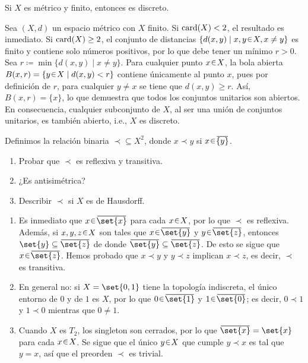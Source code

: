 \begin{ejer}
Si $X$ es métrico y finito, entonces es discreto.
\end{ejer}
\begin{sol}
Sea $(X,d)$ un espacio métrico con $X$ finito. Si $\operatorname{card}(X) < 2$, el resultado es inmediato. Si $\operatorname{card}(X) \ge 2$, el conjunto de distancias $\{ d(x,y) \mid x,y \en X, x \neq y \}$ es finito y contiene solo números positivos, por lo que debe tener un mínimo $r > 0$.
Sea $r \coloneq \min\{ d(x,y) \mid x \neq y \}$. Para cualquier punto $x \en X$, la bola abierta $B(x,r) = \{y \en X \mid d(x,y) < r\}$ contiene únicamente al punto $x$, pues por definición de $r$, para cualquier $y \neq x$ se tiene que $d(x,y) \ge r$.
Así, $B(x,r) = \{x\}$, lo que demuestra que todos los conjuntos unitarios son abiertos. En consecuencia, cualquier subconjunto de $X$, al ser una unión de conjuntos unitarios, es también abierto, i.e., $X$ es discreto.
\end{sol}

\begin{ejer}
Definimos la relación binaria ${\prec}\subseteq X^{2}$, donde $x\prec y$ si $x\en\ubar{\{y\}}$.
\begin{enumerate}[label = (\alph*)]
    \item Probar que $\prec$ es reflexiva y transitiva.
    \item ¿Es antisimétrica?
    \item Describir $\prec$ si $X$ es de Hausdorff.
\end{enumerate}
\end{ejer}
\begin{sol}[Demostración]
\hphantom{e}
\begin{enumerate}[label = (\alph*)]
    \item Es inmediato que $x \en \ubar{\set{x}}$ para cada $x \en X$, por lo que $\prec$ es reflexiva. Además, si $x, y, z \en X$ son tales que $x \en \ubar{\set{y}}$ y $y \en \ubar{\set{z}}$, entonces $\set{y} \subseteq \ubar{\set{z}}$ de donde $\ubar{\set{y}} \subseteq \ubar{\set{z}}$. De esto se sigue que $x \en \ubar{\set{z}}$. Hemos probado que $x\prec y$ y $y \prec z$ implican $x \prec z$, es decir, $\prec$ es transitiva.

    \item En general no: si $X = \set{0,1}$ tiene la topología indiscreta, el único entorno de $0$ y de $1$ es $X$, por lo que $0 \en \ubar{\set{1}}$ y $1 \en \ubar{\set{0}}$; es decir, $0 \prec 1$ y $1 \prec 0$ mientras que $0 \neq 1$.

    \item Cuando $X$ es $T_2$, los singleton son cerrados, por lo que $\ubar{\set{x}} = \set{x}$ para cada $x \en X$. Se sigue que el único $y \en X$ que cumple $y \prec x$ es tal que $y = x$, así que el preorden $\prec$ es trivial.\qedhere
\end{enumerate}
\end{sol}\clearpage


